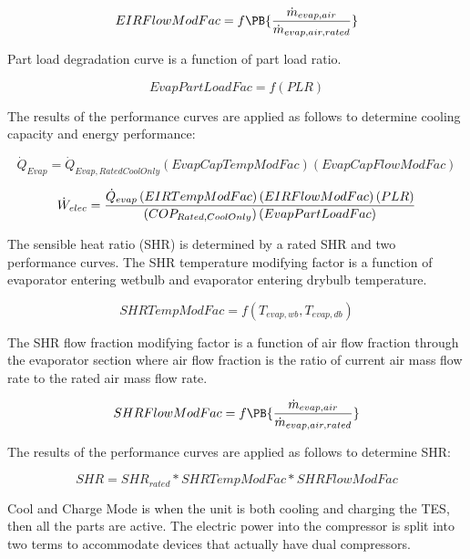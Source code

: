 \begin{equation}
  EIRFlowModFac = f\PB{\frac{\dot{m}_{evap,air}}{\dot{m}_{evap,air,rated}}}
\end{equation}

Part load degradation curve is a function of part load ratio.

\begin{equation}
EvapPartLoadFac = f\left( {PLR} \right)
\end{equation}

The results of the performance curves are applied as follows to determine cooling capacity and energy performance:

\begin{equation}
{\dot Q_{Evap}} = {\dot Q_{Evap,RatedCoolOnly}}\left( {EvapCapTempModFac} \right)\left( {EvapCapFlowModFac} \right)
\end{equation}

\begin{equation}
{\dot W_{elec}} = \frac{{{{\dot Q}_{evap}}\left( {EIRTempModFac} \right)\left( {EIRFlowModFac} \right)\left( {PLR} \right)}}{{\left( {CO{P_{Rated,{\rm{}}CoolOnly}}} \right)\left( {EvapPartLoadFac} \right)}}
\end{equation}

The sensible heat ratio (SHR) is determined by a rated SHR and two performance curves. The SHR temperature modifying factor is a function of evaporator entering wetbulb and evaporator entering drybulb temperature.

\begin{equation}
SHRTempModFac = f\left( {{T_{evap,wb}},{T_{evap,db}}} \right)
\end{equation}

The SHR flow fraction modifying factor is a function of air flow fraction through the evaporator section where air flow fraction is the ratio of current air mass flow rate to the rated air mass flow rate.

\begin{equation}
  SHRFlowModFac = f\PB{\frac{\dot{m}_{evap,air}}{\dot{m}_{evap,air,rated}}}
\end{equation}

The results of the performance curves are applied as follows to determine SHR:

\begin{equation}
SHR = SH{R_{rated}}*SHRTempModFac*SHRFlowModFac
\end{equation}

Cool and Charge Mode is when the unit is both cooling and charging the TES, then all the parts are active. The electric power into the compressor is split into two terms to accommodate devices that actually have dual compressors.

